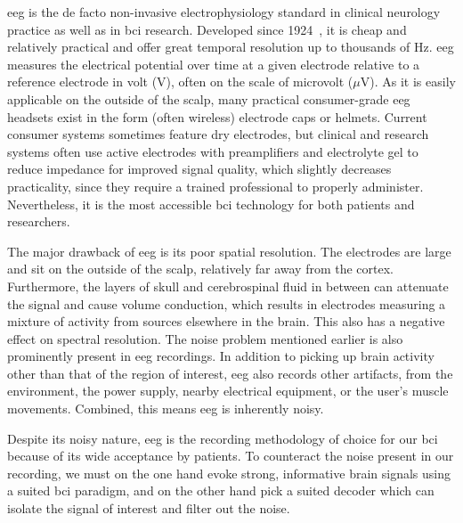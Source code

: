 \Ac{eeg} is the de facto non-invasive electrophysiology standard in clinical
neurology practice as well as in \ac{bci} research.
Developed since 1924~\cite{Berger1929}, it is cheap and relatively practical and
offer great temporal resolution up to thousands of Hz.
\Ac{eeg} measures the electrical potential over time at a given electrode relative to a
reference electrode in volt (V), often on the scale of microvolt ($\mu$V).
As it is easily applicable on the outside of the scalp, many practical
consumer-grade \ac{eeg} headsets exist in the form (often wireless) electrode
caps or helmets.
Current consumer systems sometimes feature dry electrodes, but clinical and
research systems often use active electrodes with preamplifiers and
electrolyte gel to reduce impedance for improved signal
quality, which slightly decreases practicality, since they require a trained
professional to properly administer.
Nevertheless, it is the most accessible \ac{bci} technology for both patients
and researchers.

The major drawback of \ac{eeg} is its poor spatial resolution.
The electrodes are large and sit on the outside of the scalp, relatively far
away from the cortex.
Furthermore, the layers of skull and cerebrospinal fluid in between can
attenuate the signal and cause volume conduction, which results in electrodes
measuring a mixture of activity from sources elsewhere in the brain.
This also has a negative effect on spectral resolution.
The noise problem mentioned earlier is also prominently present in \ac{eeg}
recordings.
In addition to picking up brain activity other than that of the region of
interest, \ac{eeg} also records other artifacts, from the environment, the power
supply, nearby electrical equipment, or the user's muscle movements.
Combined, this means \ac{eeg} is inherently noisy.

Despite its noisy nature, \ac{eeg} is the recording methodology of choice for
our \ac{bci} because of its wide acceptance by patients.
To counteract the noise present in our recording, we must on the one hand evoke
strong, informative brain signals using a suited \ac{bci} paradigm, and on the
other hand pick a suited decoder which can isolate the signal of interest and
filter out the noise.

